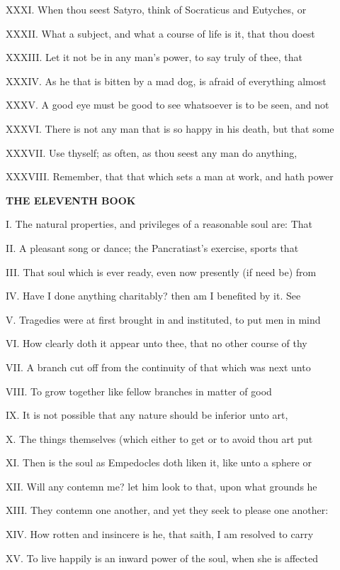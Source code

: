 XXXI. When thou seest Satyro, think of
Socraticus and Eutyches, or

XXXII. What a subject, and what a course of
life is it, that thou doest

XXXIII. Let it not be in any man's power, to
say truly of thee, that

XXXIV. As he that is bitten by a mad dog, is
afraid of everything almost

XXXV. A good eye must be good to see
whatsoever is to be seen, and not

XXXVI. There is not any man that is so happy
in his death, but that some

XXXVII. Use thyself; as often, as thou seest
any man do anything,

XXXVIII. Remember, that that which sets a man
at work, and hath power

\textbf{THE ELEVENTH BOOK}

I. The natural properties, and privileges of a
reasonable soul are: That

II. A pleasant song or dance; the
Pancratiast's exercise, sports that

III. That soul which is ever ready, even now
presently (if need be) from

IV. Have I done anything charitably? then am I
benefited by it. See

V. Tragedies were at first brought in and
instituted, to put men in mind

VI. How clearly doth it appear unto thee, that
no other course of thy

VII. A branch cut off from the continuity of
that which was next unto

VIII. To grow together like fellow branches in
matter of good

IX. It is not possible that any nature should
be inferior unto art,

X. The things themselves (which either to get
or to avoid thou art put

XI. Then is the soul as Empedocles doth liken
it, like unto a sphere or

XII. Will any contemn me? let him look to
that, upon what grounds he

XIII. They contemn one another, and yet they
seek to please one another:

XIV. How rotten and insincere is he, that
saith, I am resolved to carry

XV. To live happily is an inward power of the
soul, when she is affected


